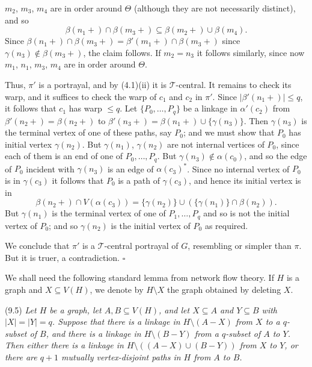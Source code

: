 \noindent $m_2$, $m_3$, $m_4$ are in order around $\Theta$ (although they are not necessarily distinct), and so
\begin{equation*}
\beta(n_1+) \cap \beta(m_3+) \subseteq \beta(m_2+) \cup \beta(m_4).
\end{equation*}
Since $\beta(n_1+) \cap \beta(m_3+) = \beta'(m_1+) \cap \beta(m_3+)$ since $\gamma(n_3) \notin \beta(m_3+)$, the claim follows. If $m_2 = n_3$ it follows similarly, since now $m_1$, $n_1$, $m_3$, $m_4$ are in order around $\Theta$.

Thus, $\pi'$ is a portrayal, and by (4.1)(ii) it is $\mathcal{T}$-central. It remains to check its warp, and it suffices to check the warp of $c_1$ and $c_2$ in $\pi'$. Since $|\beta'(n_1 +)| \le q$, it follows that $c_1$ has warp $\le q$. Let $\{P_0, \dots, P_q\}$ be a linkage in $\alpha'(c_2)$ from $\beta'(n_2+) = \beta(n_2+)$ to $\beta'(n_3+) = \beta(n_1+) \cup \{\gamma(n_3)\}$. Then $\gamma(n_3)$ is the terminal vertex of one of these paths, say $P_0$; and we must show that $P_0$ has initial vertex $\gamma(n_2)$. But $\gamma(n_1)$, $\gamma(n_2)$ are not internal vertices of $P_0$, since each of them is an end of one of $P_0, \dots, P_q$. But $\gamma(n_3) \notin \alpha(c_0)$, and so the edge of $P_0$ incident with $\gamma(n_3)$ is an edge of $\alpha(c_3)^*$. Since no internal vertex of $P_0$ is in $\gamma(c_3)$ it follows that $P_0$ is a path of $\gamma(c_3)$, and hence its initial vertex is in
\begin{equation*}
\beta(n_2+) \cap V(\alpha(c_3)) = \{\gamma(n_2)\} \cup (\{\gamma(n_1)\} \cap \beta(n_2)).
\end{equation*}
But $\gamma(n_1)$ is the terminal vertex of one of $P_1, \dots, P_q$ and so is not the initial vertex of $P_0$; and so $\gamma(n_2)$ is the initial vertex of $P_0$ as required.

We conclude that $\pi'$ is a $\mathcal{T}$-central portrayal of $G$, resembling or simpler than $\pi$. But it is truer, a contradiction. $\square$

We shall need the following standard lemma from network flow theory. If $H$ is a graph and $X \subseteq V(H)$, we denote by $H \setminus X$ the graph obtained by deleting $X$.

\stmt
(9.5) \textit{Let $H$ be a graph, let $A, B \subseteq V(H)$, and let $X \subseteq A$ and $Y \subseteq B$ with $|X| = |Y| = q$. Suppose that there is a linkage in $H \setminus (A - X)$ from $X$ to a $q$-subset of $B$, and there is a linkage in $H \setminus (B - Y)$ from a $q$-subset of $A$ to $Y$. Then either there is a linkage in $H \setminus ((A - X) \cup (B - Y))$ from $X$ to $Y$, or there are $q + 1$ mutually vertex-disjoint paths in $H$ from $A$ to $B$.}

